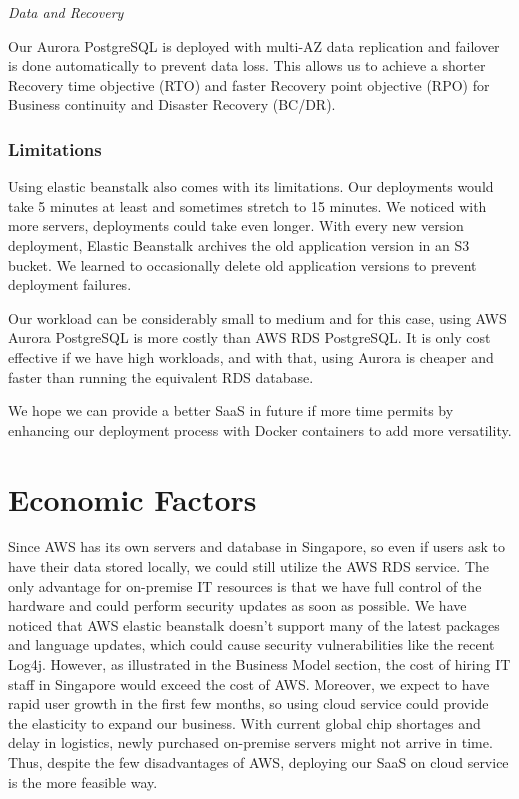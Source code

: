 \documentclass[12pt,a4paper]{article}
\begin{document}
            \textit{Data and Recovery}
            
            Our Aurora PostgreSQL is deployed with multi-AZ data replication and failover is done automatically to prevent data loss. This allows us to achieve a shorter Recovery time objective (RTO) and faster Recovery point objective (RPO) for Business continuity and Disaster Recovery (BC/DR).

        \subsubsection{Limitations}
        
        Using elastic beanstalk also comes with its limitations. Our deployments would take 5 minutes at least and sometimes stretch to 15 minutes. We noticed with more servers, deployments could take even longer. With every new version deployment, Elastic Beanstalk archives the old application version in an S3 bucket. We learned to occasionally delete old application versions to prevent deployment failures.

        Our workload can be considerably small to medium and for this case, using AWS Aurora PostgreSQL is more costly than AWS RDS PostgreSQL. It is only cost effective if we have high workloads, and with that, using Aurora is cheaper and faster than running the equivalent RDS database.
        
        We hope we can provide a better SaaS in future if more time permits by enhancing our deployment process with Docker containers to add more versatility.

\section{Economic Factors}

Since AWS has its own servers and database in Singapore, so even if users ask to have their data stored locally, we could still utilize the AWS RDS service. The only advantage for on-premise IT resources is that we have full control of the hardware and could perform security updates as soon as possible. We have noticed that AWS elastic beanstalk doesn’t support many of the latest packages and language updates, which could cause security vulnerabilities like the recent Log4j. However, as illustrated in the Business Model section, the cost of hiring IT staff in Singapore would exceed the cost of AWS. Moreover, we expect to have rapid user growth in the first few months, so using cloud service could provide the elasticity to expand our business. With current global chip shortages and delay in logistics, newly purchased on-premise servers might not arrive in time. Thus, despite the few disadvantages of AWS, deploying our SaaS on cloud service is the more feasible way.
\end{document}
